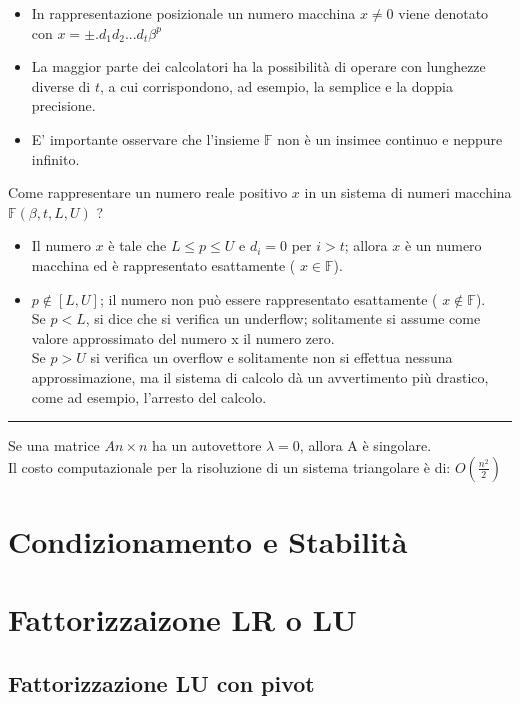 \documentclass{article}
\begin{document}
\begin{itemize}
	\item In rappresentazione posizionale un numero macchina $x \neq 0$ viene denotato con $x = \pm .d_1 d_2 ... d_t \beta ^p$
	\item La maggior parte dei calcolatori ha la possibilità di operare con lunghezze diverse di $t$, a cui corrispondono, ad esempio, la semplice e la doppia precisione.
	\item E' importante osservare che l'insieme $\mathbb{F}$ non è un insimee continuo e neppure infinito.
\end{itemize}
Come rappresentare un numero reale positivo $x$ in un sistema di numeri macchina $\mathbb{F} ( \beta, t, L, U)$ ?
\begin{itemize}
	\item Il numero $x$ è tale che $L \leq p \leq U$ e $d_i = 0$ per $i > t$; allora $x$ è un numero macchina ed è rappresentato esattamente ({\color{blue} $x \in \mathbb{F}$}).
	\item $p \notin \left [ L, U \right ]$; il numero non può essere rappresentato esattamente ({\color{blue} $x \notin \mathbb{F}$}).
\\Se $p < L$, si dice che si verifica un underflow; solitamente si assume come valore approssimato del numero x il numero zero.
\\Se $p > U$ si verifica un overflow e solitamente non si effettua nessuna approssimazione, ma il sistema di calcolo dà un avvertimento più drastico, come ad esempio, l'arresto del calcolo.
\end{itemize}

\noindent\rule{\textwidth}{0.4pt}

Se una matrice $A n \times n$ ha un autovettore $\lambda = 0$, allora A è singolare.\\
Il costo computazionale per la risoluzione di un sistema triangolare è di: 
$O ( \frac{n^2}{2} ) $
	\newpage

	\section{Condizionamento e Stabilità}
	\section{Fattorizzaizone LR o LU}
	\subsection{Fattorizzazione LU con pivot}
\end{document}
